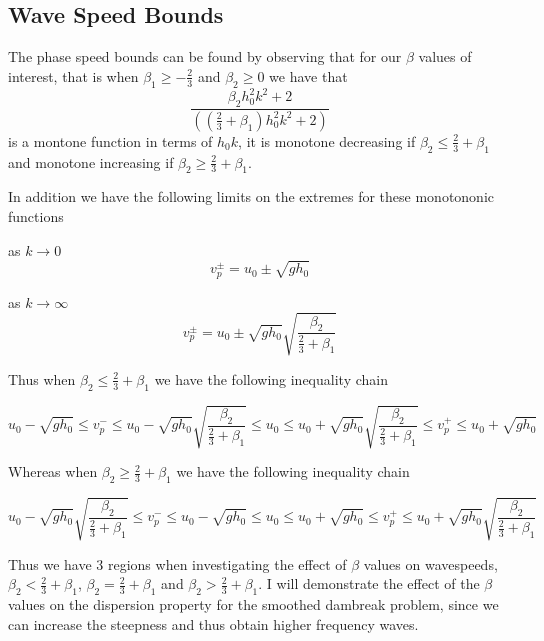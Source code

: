 \documentclass[10pt]{article}
\begin{document}
\subsection{Wave Speed Bounds}
The phase speed bounds can be found by observing that for our $\beta$ values of interest, that is  when $\beta_1 \ge -\frac{2}{3}$ and $\beta_2 \ge 0$ we have that 
\begin{equation}
\dfrac{\beta_2 h_0^2 k^2 + 2}{\left( \left(\frac{2}{3} + \beta_1\right) h_0^2 k^2 + 2\right)}
\end{equation}
is a montone function in terms of $h_0k$, it is monotone decreasing if $\beta_2 \le \frac{2}{3} + \beta_1$ and monotone increasing if $\beta_2 \ge \frac{2}{3} + \beta_1$.
 
In addition we have the following limits on the extremes for these monotononic functions

as $k \rightarrow 0$
\begin{equation}
 v^\pm_p = u_0 \pm \sqrt{gh_0}
\end{equation} 

as $k \rightarrow \infty$
\begin{equation}
v^\pm_p = u_0 \pm \sqrt{gh_0} \sqrt{\dfrac{\beta_2}{\frac{2}{3} + \beta_1}}
\end{equation}

Thus when $\beta_2 \le \frac{2}{3} + \beta_1$ we have the following inequality chain

\begin{equation}
\label{eqn:phasespeedserre}
u_0 -  \sqrt{gh_0} \le  v^-_p \le u_0 - \sqrt{gh_0} \sqrt{\dfrac{\beta_2}{\frac{2}{3} + \beta_1}} \le u_0 \le u_0 + \sqrt{gh_0} \sqrt{\dfrac{\beta_2}{\frac{2}{3} + \beta_1}} \le   v^+_p  \le u_0 +   \sqrt{gh_0}
\end{equation}


Whereas when $\beta_2 \ge \frac{2}{3} + \beta_1$ we have the following inequality chain

\begin{equation}
u_0 - \sqrt{gh_0} \sqrt{\dfrac{\beta_2}{\frac{2}{3} + \beta_1}} \le v^-_p \le u_0 -  \sqrt{gh_0} \le  u_0 \le u_0 + \sqrt{gh_0} \le   v^+_p  \le u_0 +  \sqrt{gh_0} \sqrt{\dfrac{\beta_2}{\frac{2}{3} + \beta_1}}
\end{equation}

Thus we have 3 regions when investigating the effect of $\beta$ values on wavespeeds, $\beta_2 < \frac{2}{3} + \beta_1$, $\beta_2 = \frac{2}{3} + \beta_1$ and $\beta_2 > \frac{2}{3} + \beta_1$. I will demonstrate the effect of the $\beta$ values on the dispersion property for the smoothed dambreak problem, since we can increase the steepness and thus obtain higher frequency waves. 
\end{document}
